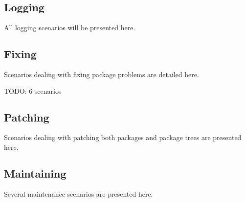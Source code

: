 




\subsection{Logging}
All logging scenarios will be presented here.








\subsection{Fixing}
Scenarios dealing with fixing package problems are detailed here.

TODO: 6 scenarios

%
%
%
%
%
%


\subsection{Patching}
Scenarios dealing with patching both packages and package trees are presented here.





\subsection{Maintaining}
Several maintenance scenarios are presented here.





